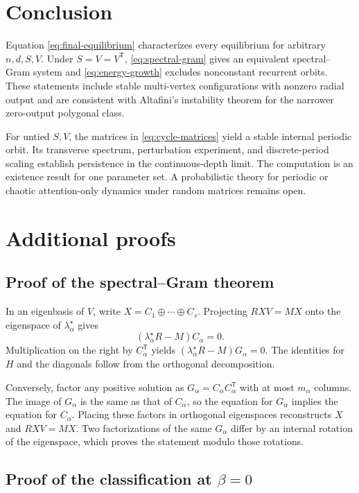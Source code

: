 \documentclass[11pt,a4paper]{article}
\theoremstyle{definition}
\newcommand{\T}{\mathsf T}
\begin{document}
\section{Conclusion}

Equation \eqref{eq:final-equilibrium} characterizes every equilibrium for arbitrary
$n,d,S,V$. Under $S=V=V^{\T}$, \eqref{eq:spectral-gram} gives an equivalent
spectral--Gram system and \eqref{eq:energy-growth} excludes nonconstant recurrent
orbits. These statements include stable multi-vertex configurations with nonzero
radial output and are consistent with Altafini's instability theorem for the narrower
zero-output polygonal class.

For untied $S,V$, the matrices in \eqref{eq:cycle-matrices} yield a stable internal
periodic orbit. Its transverse spectrum, perturbation experiment, and discrete-period
scaling establish persistence in the continuous-depth limit. The computation is an
existence result for one parameter set. A probabilistic theory for periodic or chaotic
attention-only dynamics under random matrices remains open.

\appendix

\section{Additional proofs}
\label{app:proofs}

\subsection{Proof of the spectral--Gram theorem}

In an eigenbasis of $V$, write $X=C_1\oplus\cdots\oplus C_s$. Projecting
$RXV=MX$ onto the eigenspace of $\lambda_\alpha^\star$ gives
\[
 (\lambda_\alpha^\star R-M)C_\alpha=0.
\]
Multiplication on the right by $C_\alpha^{\T}$ yields
$(\lambda_\alpha^\star R-M)G_\alpha=0$. The identities for $H$ and the diagonals
follow from the orthogonal decomposition.

Conversely, factor any positive solution as
$G_\alpha=C_\alpha C_\alpha^{\T}$ with at most $m_\alpha$ columns. The image of
$G_\alpha$ is the same as that of $C_\alpha$, so the equation for $G_\alpha$ implies
the equation for $C_\alpha$. Placing these factors in orthogonal eigenspaces
reconstructs $X$ and $RXV=MX$. Two factorizations of the same $G_\alpha$ differ by an
internal rotation of the eigenspace, which proves the statement modulo those rotations.

\subsection{Proof of the classification at \texorpdfstring{$\beta=0$}{beta = 0}}
\end{document}
